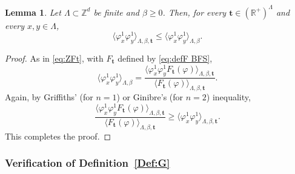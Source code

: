 \documentclass[11pt,a4paper]{article}
\numberwithin{equation}{section}
\theoremstyle{plain}
\newtheorem{Lem}[Thm]{Lemma}
\theoremstyle{definition}
\newcommand\1{\mathds{1}}
\begin{document}
\begin{Lem}
\label{lem:BFS time decreases 2pt}
Let $\Lambda\subset \mathbb Z^d$ be finite and $\beta\geq 0$. Then, for every $\mathbf{t}\in (\mathbb R^+)^\Lambda$ and every $x,y\in \Lambda$,
\begin{equation}
	\langle\varphi_x^1\varphi_y^1\rangle_{\Lambda,\beta,\mathbf{t}}\leq \langle\varphi_x^1\varphi_y^1\rangle_{\Lambda,\beta}.
\end{equation}
\end{Lem}

\begin{proof}
As in \eqref{eq:ZFt}, with $F_{\mathbf{t}}$ defined by \eqref{eq:defF BFS},
\begin{equation}
	\langle \varphi_x^1\varphi_y^1\rangle_{\Lambda,\beta}
    =\frac{\langle\varphi_x^1\varphi_y^1 F_{\mathbf{t}}(\varphi)\rangle_{\Lambda,\beta,\mathbf{t}}}
    {\langle F_{\mathbf{t}}(\varphi)\rangle_{\Lambda,\beta,\mathbf{t}}}.
\end{equation}
Again, by Griffiths' (for $n=1$) or Ginibre's (for $n=2$) inequality,
\begin{equation}
	\frac{\langle\varphi_x^1\varphi_y^1
    F_{\mathbf{t}}(\varphi)\rangle_{\Lambda,\beta,\mathbf{t}}}
    {\langle F_{\mathbf{t}}(\varphi)\rangle_{\Lambda,\beta,\mathbf{t}}}
    \geq \langle\varphi_x^1\varphi_y^1\rangle_{\Lambda,\beta,\mathbf{t}}.
\end{equation}
This completes the proof.
\end{proof}



\subsubsection{Verification of Definition~\ref{Def:G}}
\end{document}
